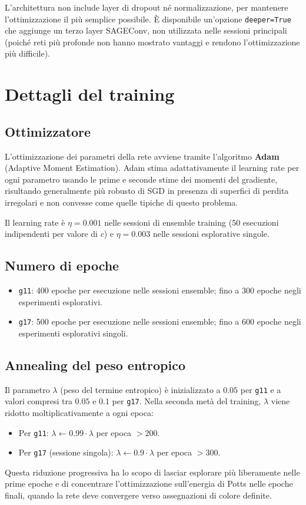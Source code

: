 \documentclass[11pt, a4paper]{article}
\begin{document}
L'architettura non include layer di dropout né normalizzazione, per mantenere
l'ottimizzazione il più semplice possibile. È disponibile un'opzione \texttt{deeper=True}
che aggiunge un terzo layer SAGEConv, non utilizzata nelle sessioni principali (poiché reti
più profonde non hanno mostrato vantaggi e rendono l'ottimizzazione più difficile).

\section{Dettagli del training}

\subsection*{Ottimizzatore}

L'ottimizzazione dei parametri della rete avviene tramite l'algoritmo \textbf{Adam}
(Adaptive Moment Estimation). Adam stima adattativamente il learning rate per ogni
parametro usando le prime e seconde stime dei momenti del gradiente, risultando
generalmente più robusto di SGD in presenza di superfici di perdita irregolari e non
convesse come quelle tipiche di questo problema.

Il learning rate è $\eta = 0.001$ nelle sessioni di ensemble training (50 esecuzioni
indipendenti per valore di $c$) e $\eta = 0.003$ nelle sessioni esplorative singole.

\subsection*{Numero di epoche}

\begin{itemize}
    \item \texttt{g11}: 400 epoche per esecuzione nelle sessioni ensemble; fino a 300
    epoche negli esperimenti esplorativi.
    \item \texttt{g17}: 500 epoche per esecuzione nelle sessioni ensemble; fino a 600
    epoche negli esperimenti esplorativi singoli.
\end{itemize}

\subsection*{Annealing del peso entropico}

Il parametro $\lambda$ (peso del termine entropico) è inizializzato a $0.05$ per
\texttt{g11} e a valori compresi tra $0.05$ e $0.1$ per \texttt{g17}. Nella seconda metà
del training, $\lambda$ viene ridotto moltiplicativamente a ogni epoca:
\begin{itemize}
    \item Per \texttt{g11}: $\lambda \leftarrow 0.99 \cdot \lambda$ per epoca $> 200$.
    \item Per \texttt{g17} (sessione singola): $\lambda \leftarrow 0.9 \cdot \lambda$ per
    epoca $> 300$.
\end{itemize}
Questa riduzione progressiva ha lo scopo di lasciar esplorare più liberamente nelle prime
epoche e di concentrare l'ottimizzazione sull'energia di Potts nelle epoche finali, quando
la rete deve convergere verso assegnazioni di colore definite.
\end{document}
